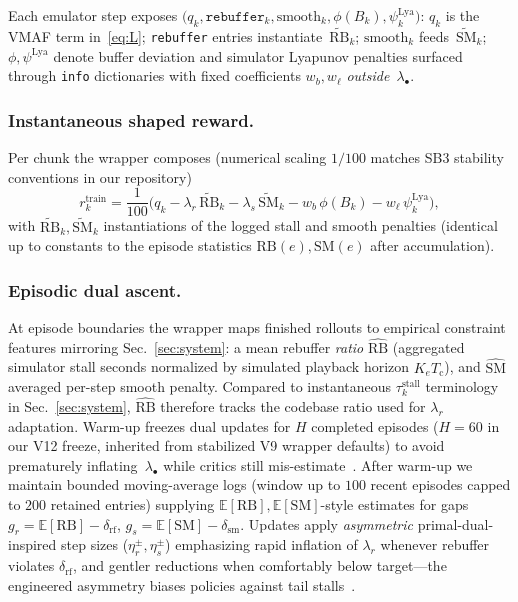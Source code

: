 \documentclass[preprint,12pt]{elsarticle}
\begin{document}
Each emulator step exposes \(\big(q_k,\texttt{rebuffer}_k,\mathrm{smooth}_k,\phi(B_k),\psi^{\mathrm{Lya}}_k\big)\): \(q_k\) is the VMAF term in~\eqref{eq:L}; \texttt{rebuffer} entries instantiate~\(\widetilde{\mathrm{RB}}_k\); \(\mathrm{smooth}_k\) feeds~\(\widetilde{\mathrm{SM}}_k\); \(\phi,\psi^{\mathrm{Lya}}\) denote buffer deviation and simulator Lyapunov penalties surfaced through \texttt{info} dictionaries with fixed coefficients \(w_b,w_\ell\) \emph{outside}~\(\lambda_{\bullet}\).

\subsubsection{Instantaneous shaped reward.}
Per chunk the wrapper composes (numerical scaling \(1/100\) matches SB3 stability conventions in our repository)
\begin{equation}
\label{eq:rtrain}
    r^{\mathrm{train}}_k
    = \frac{1}{100}\Big(
        q_k
        - \lambda_r \,\widetilde{\mathrm{RB}}_k
        - \lambda_s \,\widetilde{\mathrm{SM}}_k
        - w_b\,\phi(B_k)
        - w_\ell\,\psi^{\mathrm{Lya}}_k
    \Big),
\end{equation}
with \(\widetilde{\mathrm{RB}}_k,\widetilde{\mathrm{SM}}_k\) instantiations of the logged stall and smooth penalties (identical up to constants to the episode statistics \(\mathrm{RB}(e),\mathrm{SM}(e)\) after accumulation).

\subsubsection{Episodic dual ascent.}
At episode boundaries the wrapper maps finished rollouts to empirical constraint features mirroring Sec.~\ref{sec:system}: a mean rebuffer \emph{ratio} \(\hat{\mathrm{RB}}\) (aggregated simulator stall seconds normalized by simulated playback horizon \(K_e T_{\mathrm{c}}\)), and \(\hat{\mathrm{SM}}\) averaged per-step smooth penalty.
Compared to instantaneous \(\tau^{\mathrm{stall}}_k\) terminology in Sec.~\ref{sec:system}, \(\hat{\mathrm{RB}}\) therefore tracks the codebase ratio used for \(\lambda_r\) adaptation.
Warm-up freezes dual updates for \(H\) completed episodes (\(H{=}60\) in our V12 freeze, inherited from stabilized V9 wrapper defaults) to avoid prematurely inflating~\(\lambda_{\bullet}\) while critics still mis-estimate~\cite{sutton2018reinforcement,paternain2019dual}.
After warm-up we maintain bounded moving-average logs (window up to \(100\) recent episodes capped to \(200\) retained entries) supplying \(\mathbb{E}[\mathrm{RB}],\mathbb{E}[\mathrm{SM}]\)-style estimates for gaps \(g_r=\mathbb{E}[\mathrm{RB}]-\delta_{\mathrm{rf}}\), \(g_s=\mathbb{E}[\mathrm{SM}]-\delta_{\mathrm{sm}}\).
Updates apply \emph{asymmetric} primal-dual-inspired step sizes (\(\eta^{\pm}_r,\eta^{\pm}_s\)) emphasizing rapid inflation of \(\lambda_r\) whenever rebuffer violates \(\delta_{\mathrm{rf}}\), and gentler reductions when comfortably below target—the engineered asymmetry biases policies against tail stalls~\cite{tian2022towards}.
\end{document}
